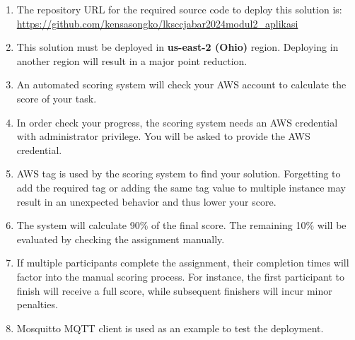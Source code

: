 \documentclass{article}
\begin{document}
\begin{enumerate}
  \item The repository URL for the required source code to deploy this solution is:\\
  \href{https://github.com/kensasongko/lksccjabar2024modul2_aplikasi}{https://github.com/kensasongko/lksccjabar2024modul2\_aplikasi}
  \item This solution must be deployed in \textbf{us-east-2 (Ohio)} region. Deploying in another region will result in a major point reduction.
  \item An automated scoring system will check your AWS account to calculate the score of your task.
  \item In order check your progress, the scoring system needs an AWS credential with administrator privilege. You will be asked to provide the AWS credential.
  \item AWS tag is used by the scoring system to find your solution. Forgetting to add the required tag or adding the same tag value to multiple instance may result in an unexpected behavior and thus lower your score.
  \item The system will calculate 90\% of the final score. The remaining 10\% will be evaluated by checking the assignment manually.
  \item If multiple participants complete the assignment, their completion times will factor into the manual scoring process. For instance, the first participant to finish will receive a full score, while subsequent finishers will incur minor penalties.
  \item Mosquitto MQTT client is used as an example to test the deployment.
\end{enumerate}
\end{document}
